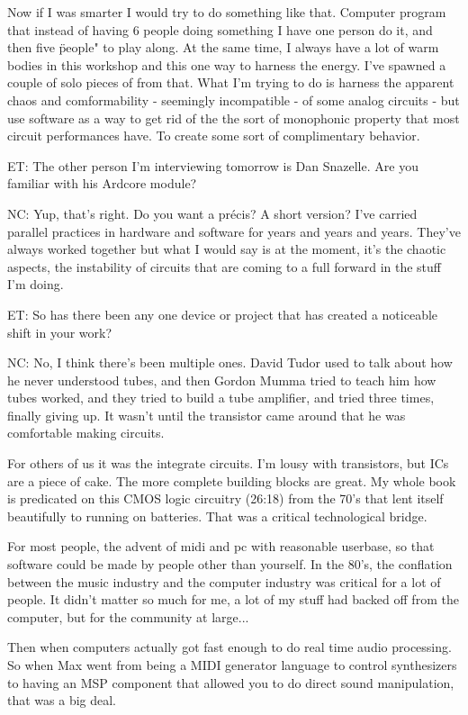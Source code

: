 Now if I was smarter I would try to do something like that. Computer program that instead of having 6 people doing something I have one person do it, and then five \"people" to play along. At the same time, I always have a lot of warm bodies in this workshop and this one way to harness the energy. I've spawned a couple of solo pieces of from that. What I'm trying to do is harness the apparent chaos and comformability - seemingly incompatible - of some analog circuits - but use software as a way to get rid of the the sort of monophonic property that most circuit performances have. To create some sort of complimentary behavior. 

ET: The other person I'm interviewing tomorrow is Dan Snazelle. Are you familiar with his Ardcore module? 

NC: Yup, that's right. Do you want a précis? A short version? I've carried parallel practices in hardware and software for years and years and years. They've always worked together but what I would say is at the moment, it's the chaotic aspects, the instability of circuits that are coming to a full forward in the stuff I'm doing. 

ET: So has there been any one device or project that has created a noticeable shift in your work? 

NC: No, I think there's been multiple ones. David Tudor used to talk about how he never understood tubes, and then Gordon Mumma tried to teach him how tubes worked, and they tried to build a tube amplifier, and tried three times, finally giving up. It wasn't until the transistor came around that he was comfortable making circuits. 

For others of us it was the integrate circuits. I'm lousy with transistors, but ICs are a piece of cake. The more complete building blocks are great. My whole book is predicated on this CMOS logic circuitry (26:18) from the 70's that lent itself beautifully to running on batteries. That was a critical technological bridge. 

For most people, the advent of midi and pc with reasonable userbase, so that software could be made by people other than yourself. In the 80's, the conflation between the music industry and the computer industry was critical for a lot of people. It didn't matter so much for me, a lot of my stuff had backed off from the computer, but for the community at large... 

Then when computers actually got fast enough to do real time audio processing. So when Max went from being a MIDI generator language to control synthesizers to having an MSP component that allowed you to do direct sound manipulation, that was a big deal. 


